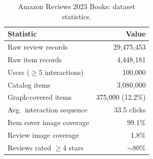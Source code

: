 \begin{table}[t]
\centering
\caption{Amazon Reviews 2023 Books: dataset statistics.}
\label{tab:dataset}
\begin{tabular}{lr}
\toprule
\textbf{Statistic} & \textbf{Value} \\
\midrule
Raw review records            & 29,475,453        \\
Raw item records              & 4,448,181         \\
Users ($\geq$5 interactions)  & 100,000           \\
Catalog items                 & 3,080,000         \\
Graph-covered items           & 375,000 (12.2\%)  \\
Avg.\ interaction sequence    & 33.5 clicks       \\
Item cover image coverage     & 99.1\%            \\
Review image coverage         & 1.8\%             \\
Reviews rated $\geq$4 stars   & $\sim$80\%        \\
\bottomrule
\end{tabular}
\end{table}

